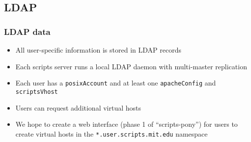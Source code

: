 \subsection{LDAP}

\begin{frame}
  \frametitle{LDAP data}

  \begin{itemize}
  \item All user-specific information is stored in LDAP records
  \item Each scripts server runs a local LDAP daemon with multi-master
    replication
  \item Each user has a \texttt{posixAccount} and at least one
    \texttt{apacheConfig} and \texttt{scriptsVhost}
  \item Users can request additional virtual hosts
  \item We hope to create a web interface (phase 1 of
    ``scripts-pony'') for users to create virtual hosts in the
    \texttt{*.user.scripts.mit.edu} namespace
  \end{itemize}
\end{frame}